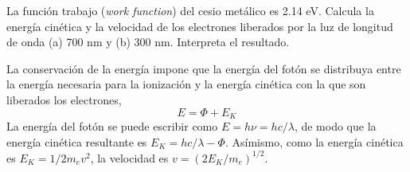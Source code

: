 \documentclass[addpoints,spanish, 12pt,a4paper]{exam}
\begin{document}
\begin{questions}
    
    \question[1] La función trabajo (\textit{work function})
    del cesio metálico es 2.14 eV. Calcula la energía 
    cinética y la velocidad de los electrones liberados
    por la luz de longitud de onda (a) 700 nm y (b) 300 nm.
    Interpreta el resultado.
    
    \begin{solution}
        \selectfont

        La conservación de la energía impone que la
        energía del fotón se distribuya entre la energía
        necesaria para la ionización y la energía cinética
        con la que son liberados los electrones,
        \begin{equation*}
            E=\Phi + E_K
        \end{equation*}
        La energía del fotón se puede escribir como
        $E=h\nu=hc/\lambda$, de modo que la energía 
        cinética resultante es $E_K=hc/\lambda - \Phi$.
        Asímismo, como la energía cinética es 
        $E_K=1/2m_ev^2$, la velocidad es $v=(2E_K/m_e)^{1/2}$.
        

\end{solution}
\end{questions}
\end{document}
